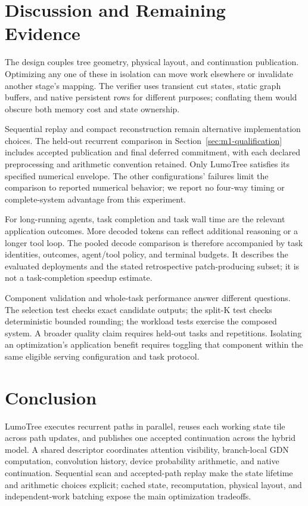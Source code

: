 \documentclass[conference]{IEEEtran}
\newcommand{\sys}{LumoTree}
\begin{document}
\section{Discussion and Remaining Evidence}
\label{sec:planned}
The design couples tree geometry, physical layout, and continuation publication. Optimizing any one of these in isolation can move work elsewhere or invalidate another stage's mapping. The verifier uses transient cut states, static graph buffers, and native persistent rows for different purposes; conflating them would obscure both memory cost and state ownership.

Sequential replay and compact reconstruction remain alternative implementation choices. The held-out recurrent comparison in Section~\ref{sec:m1-qualification} includes accepted publication and final deferred commitment, with each declared preprocessing and arithmetic convention retained. Only \sys{} satisfies its specified numerical envelope. The other configurations' failures limit the comparison to reported numerical behavior; we report no four-way timing or complete-system advantage from this experiment.

For long-running agents, task completion and task wall time are the relevant application outcomes. More decoded tokens can reflect additional reasoning or a longer tool loop. The pooled decode comparison is therefore accompanied by task identities, outcomes, agent/tool policy, and terminal budgets. It describes the evaluated deployments and the stated retrospective patch-producing subset; it is not a task-completion speedup estimate.

Component validation and whole-task performance answer different questions. The selection test checks exact candidate outputs; the split-K test checks deterministic bounded rounding; the workload tests exercise the composed system. A broader quality claim requires held-out tasks and repetitions. Isolating an optimization's application benefit requires toggling that component within the same eligible serving configuration and task protocol.

\section{Conclusion}
\sys{} executes recurrent paths in parallel, reuses each working state tile across path updates, and publishes one accepted continuation across the hybrid model. A shared descriptor coordinates attention visibility, branch-local GDN computation, convolution history, device probability arithmetic, and native continuation. Sequential scan and accepted-path replay make the state lifetime and arithmetic choices explicit; cached state, recomputation, physical layout, and independent-work batching expose the main optimization tradeoffs.
\end{document}
